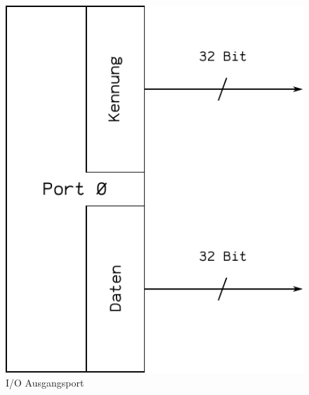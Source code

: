 \begin{figure}[htp]
 \centering
 \includegraphics{./img/UMach-IOPort.pdf}
 \caption{I/O Ausgangsport}
 \label{fig:IOPort}
\end{figure}












